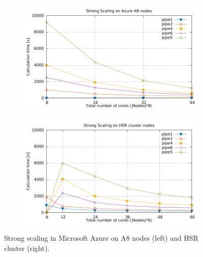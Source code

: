 \documentclass[3p,times]{elsarticle}
\begin{document}
\begin{figure}
\centering
\begin{subfigure}{.5\textwidth}
	\centering
	\includegraphics[width=\linewidth]{gplt-a8-strong-pipe}	
	\label{fig:strongA8}
\end{subfigure}
\begin{subfigure}{.5\textwidth}
	\centering
	\includegraphics[width=\linewidth]{gplt-hsr-strong-pipe}
	\label{fig:strongHSR}
\end{subfigure}

\caption{Strong scaling in Microsoft Azure on A8 nodes (left) and HSR cluster (right). }
\label{fig:strongHSR}
\end{figure}
\end{document}
